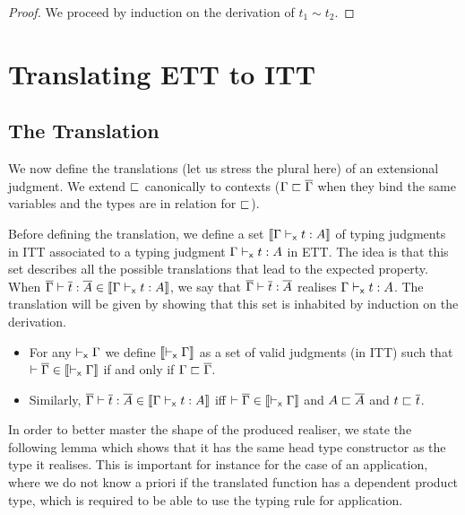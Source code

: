 \begin{proof}
  We proceed by induction on the derivation of $t_1 \sim t_2$.
\end{proof}

\section{Translating ETT to ITT}
\label{sec:translation}

\subsection{The Translation}
\label{sec:the-translation}

We now define the translations (let us stress the plural here) of an
extensional judgment. We extend $\sqsubset$ canonically to contexts
($\Gamma \sqsubset \overline{\Gamma}$ when they bind the same variables and the types are in
relation for $\sqsubset$).

Before defining the translation, we define a set
$\llbracket \Gamma \vdash_{\mathsf{x}} t : A \rrbracket$ of typing judgments
in ITT associated to a typing judgment $\Gamma \vdash_{\mathsf{x}} t : A$ in ETT.
%
The idea is that this set describes all the possible translations that
lead to the expected property. When
$\overline{\Gamma} \vdash \overline{t} : \overline{A} \in \llbracket \Gamma \vdash_{\mathsf{x}} t : A \rrbracket$, we say that
$\overline{\Gamma} \vdash \overline{t} : \overline{A}$ realises $\Gamma \vdash_{\mathsf{x}} t : A$. The
translation will be given by showing that this set is inhabited by
induction on the derivation.

\begin{definition}
  \leavevmode
  \begin{itemize}
    \item For any $\vdash_{\mathsf{x}} \Gamma$ we define $\llbracket \vdash_{\mathsf{x}} \Gamma \rrbracket$ as a set of
    valid judgments (in ITT) such that
    $\vdash \overline{\Gamma} \in \llbracket \vdash_{\mathsf{x}} \Gamma \rrbracket$ if and only if $\Gamma \sqsubset \overline{\Gamma}$.

    \item Similarly, $\overline{\Gamma} \vdash \overline{t} : \overline{A} \in \llbracket \Gamma \vdash_{\mathsf{x}} t : A \rrbracket$ iff
    $\vdash \overline{\Gamma} \in \llbracket \vdash_{\mathsf{x}} \Gamma \rrbracket$ and $A \sqsubset \overline{A}$ and $t \sqsubset \overline{t}$.
  \end{itemize}
\end{definition}

In order to better master the shape of the produced realiser, we state the
following lemma which shows that it has the same head
type constructor as the type it realises.
%
This is important for instance for the case of an application, where we
do not know a priori if the translated function has a dependent product
type, which is required to be able to use the typing rule for application.

